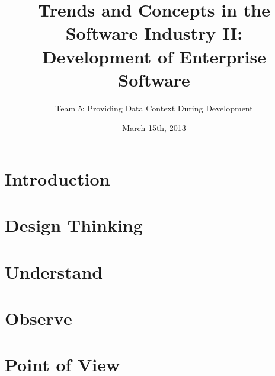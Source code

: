 \documentclass[runningheads]{llncs}
\begin{document}
\mainmatter
\title{Trends and Concepts in the Software Industry II: \\ Development of Enterprise Software}
\author{Team 5: Providing Data Context During Development}
\date{March 15th, 2013}
\maketitle

\newpage


\section{Introduction} 

\section{Design Thinking} \label{sec:DESIGN_THINKING}

\section{Understand} \label{sec:UNDERSTAND}

\section{Observe} \label{sec:OBSERVE}

\section{Point of View} \label{sec:POINT_OF_VIEW}
\end{document}
